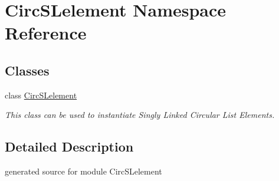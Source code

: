 \hypertarget{namespace_circ_s_lelement}{}\section{Circ\+S\+Lelement Namespace Reference}
\label{namespace_circ_s_lelement}
\subsection*{Classes}
\begin{DoxyCompactItemize}
\item 
class \hyperlink{class_circ_s_lelement_1_1_circ_s_lelement}{Circ\+S\+Lelement}
\begin{DoxyCompactList}\small\item\em This class can be used to instantiate Singly Linked Circular List Elements. \end{DoxyCompactList}\end{DoxyCompactItemize}


\subsection{Detailed Description}
\begin{DoxyVerb}generated source for module CircSLelement \end{DoxyVerb}
 